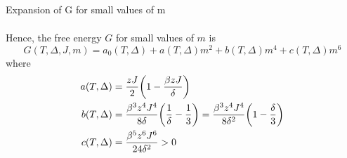 \documentclass[../main/main.tex]{subfiles}
\begin{document}
\begin{exercise}{Expansion of G for small values of m }{}
\begin{solution}
\begin{equation*}
\begin{split}
\end{split}
\end{equation*}
Hence, the free energy \(G\) for small values of \(m\) is 
\begin{equation*}
  G (T, \Delta , J, m) = a_0 (T,\Delta ) + a(T, \Delta )m^2 + b (T, \Delta ) m^4 + c(T, \Delta )m^6
\end{equation*}
where
\begin{subequations}
\begin{align*}
  a(T,\Delta ) &= \frac{z J}{2} \qty(1 - \frac{\beta z J}{\delta })   \\
  b(T,\Delta ) &= \frac{\beta ^3 z^4 J^4}{8 \delta } \qty(\frac{1}{\delta } - \frac{1}{3}) = \frac{\beta ^3 z^4 J^4}{8 \delta^2 } \qty(1 - \frac{\delta }{3})    \\
  c(T,\Delta ) &= \frac{\beta ^5 z^6 J^6}{24 \delta^2 } > 0
\end{align*}
\end{subequations}
\end{solution}

\end{exercise}
\end{document}
